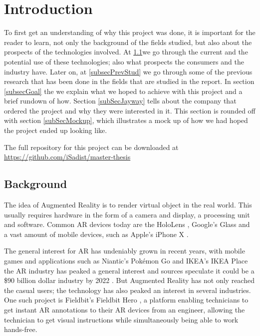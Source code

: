 \chapter{Introduction}
To first get an understanding of why this project was done, it is important for the reader to learn, not only the background of the fields studied, but also about the prospects of the technologies involved.
 At \ref{subsecBackground}we go through the current and the potential use of these technologies; also what prospects the consumers and the industry have. Later on, at  \ref{subsecPrevStud} we go through some of the previous research that has been done in the fields that are studied in the report. In section \ref{subsecGoal} the we explain what we hoped to achieve with this project and a brief rundown of how. Section \ref{subSecJayway} tells about the company that ordered the project and why they were interested in it. This section is rounded off with section \ref{subSecMockup}, which illustrates a mock up of how we had hoped the project ended up looking like.
 
 The full repository for this project can be downloaded at \url{https://github.com/iSadist/master-thesis}

\section{Background}
\label{subsecBackground}
The idea of Augmented Reality is to render virtual object in the real world. This usually 
requires hardware in the form of a camera and display, a processing unit and software. 
Common AR devices today are the HoloLens \cite{microsoft}, Google's Glass 
\cite{googleGlasses} and a vast amount of mobile devices, such as Apple's iPhone X 
\cite{appleAR}. 

The general interest for AR has undeniably grown in recent years, with mobile games and 
applications such as Niantic's Pokémon Go \cite{pokemonGO} and IKEA's IKEA Place 
\cite{IKEAPlace} the AR industry has peaked a general interest and sources speculate it 
could be a \$90 billion dollar industry by 2022 \cite{digi-capital}.
But Augmented Reality has not only reached the casual users; the technology has also 
peaked an interest in several industries. One such project is Fieldbit's Fieldbit Hero 
\cite{fieldbit}, a platform enabling technicians to get instant AR annotations to their AR 
devices from an engineer, allowing the technician to get visual instructions while 
simultaneously  being able to work hands-free. 
 

